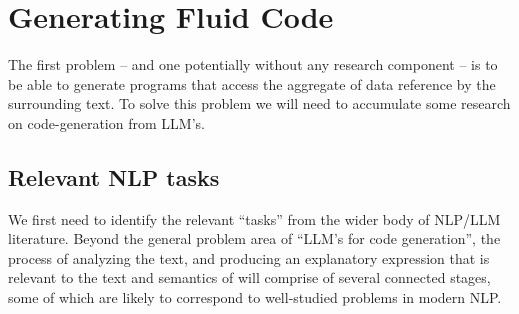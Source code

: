 \section{Generating Fluid Code}
\label{sec:generate-fluid}

The first problem -- and one potentially without any research component -- is to be able
to generate  programs that access the aggregate of data reference by the surrounding text.
To solve this problem we will need to accumulate some research on code-generation from LLM's.

\subsection{Relevant NLP tasks}
We first need to identify the relevant ``tasks'' from the wider body of NLP/LLM literature.
Beyond the general problem area of ``LLM's for code generation'', the process of analyzing the
text, and producing an explanatory expression that is relevant to the text and semantics of 
will comprise of several connected stages, some of which are likely to correspond to well-studied
problems in modern NLP.